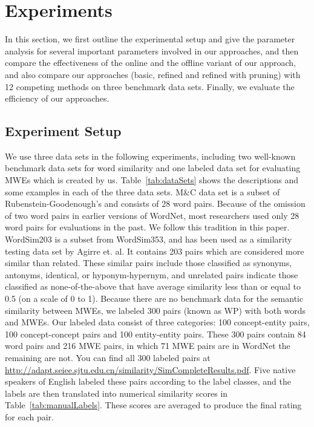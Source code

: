 \section{Experiments}
\label{sec:eval}

In this section, we first outline the experimental setup and give the parameter analysis for several important parameters involved in our approaches, 
and then compare the effectiveness of the online and the offline
variant of our approach, and also compare our approaches
(basic, refined and refined with pruning) with 12 competing
methods on three benchmark data sets.
Finally, we evaluate the efficiency of our approaches.

\subsection{Experiment Setup}
We use three data sets in the following experiments, including two well-known benchmark data sets for word similarity and one labeled data set
for evaluating MWEs which is created by us. Table~\ref{tab:dataSets} shows the descriptions and some examples in each of the three data sets.
M\&C data set is a subset of Rubenstein-Goodenough's \cite{Rubenstein:1965}
and consists of 28 word pairs.
Because of the omission of two word
pairs in earlier versions of WordNet, most researchers used only
28 word pairs for evaluations in the past. We follow this tradition in this paper.
WordSim203 is a subset from WordSim353\cite{wordSim:353}, and has been
used as a similarity testing data set\cite{Agirre:2009} by Agirre et. al.
It contains 203 pairs which are considered more similar than related.
These similar pairs include those
classified as synonyms, antonyms, identical, or hyponym-hypernym, and unrelated pairs indicate those classified as none-of-the-above that have average similarity less than or equal to 0.5 (on a scale of 0 to 1).
Because there are no benchmark data for the semantic similarity between
MWEs, we labeled 300 pairs (known as WP) with both words and MWEs. Our labeled data consist of three categories: 100 concept-entity pairs, 100
concept-concept pairs and 100 entity-entity pairs. These 300 pairs contain 84 word pairs and 216 MWE pairs, in which 71 MWE pairs are in WordNet
the remaining are not. You can find all 300 labeled pairs at \url{http://adapt.seiee.sjtu.edu.cn/similarity/SimCompleteResults.pdf}.
Five native speakers of English labeled these pairs according to the label classes, and the labels are then translated into numerical similarity
scores in Table~\ref{tab:manualLabels}. These scores are averaged to produce
the final rating for each pair.

